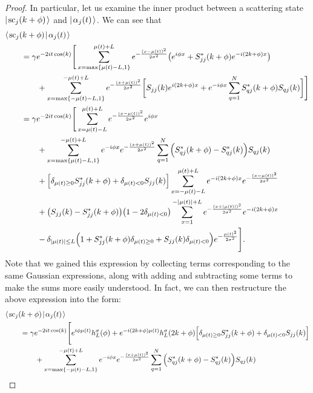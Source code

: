 \documentclass[../thesis-main/thesis-main]{subfiles}
\begin{document}
\begin{proof}
In particular, let us examine the inner product between a scattering state $|\mspace{2mu} \text{sc}_j(k+\phi) \mspace{2mu} \rangle$ and $|\mspace{2mu} \alpha_j(t) \mspace{2mu} \rangle$.  We can see that
\begin{align}
  &\langle\mspace{2mu} \text{sc}_j(k+\phi) \mspace{2mu} | \mspace{2mu} \alpha_j(t)\mspace{2mu} \rangle\nonumber\\
  &\qquad = \gamma e^{-2 i t \cos(k)}\Bigg[ \sum_{x = \max\{\mu(t) - L,1\}}^{\mu(t) + L}e^{-\frac{ (x - \mu(t))^2}{2\sigma^2}} \big( e^{ i \phi x} + S_{jj}^*(k+\phi) e^{-i (2k + \phi)x}\big)\nonumber\\
  &\qquad \qquad + \sum_{x = \max\{-\mu(t) - L,1\}}^{-\mu(t) + L} e^{-\frac{(x + \mu(t))^2}{2\sigma^2}} \bigg[S_{jj}(k) e^{ i(2k + \phi)x} + e^{-i \phi x}\sum_{q=1}^N S_{qj}^*(k+\phi) S_{qj}(k) \bigg]\Bigg]\\
  &\qquad = \gamma e^{-2it\cos(k)} \Bigg[ \sum_{x=\mu(t)-L}^{\mu(t)+L} e^{-\frac{(x-\mu(t))^2}{2\sigma^2}} e^{i \phi x}\nonumber\\
  &\qquad \qquad + \sum_{x=\max\{\mu(t) - L,1\}}^{-\mu(t)+L} e^{-i\phi x} e^{-\frac{(x+\mu(t))^2}{2\sigma^2}} \sum_{q=1}^N \Big(S_{qj}^*(k+\phi) -S_{qj}^*(k)  \Big)S_{qj}(k) \nonumber\\
  &\qquad\qquad + \Big[\delta_{\mu(t) \geq 0} S_{jj}^*(k+\phi) + \delta_{\mu(t) < 0} S_{jj}(k) \Big] \sum_{x=-\mu(t) - L}^{\mu(t) + L} e^{-i (2k + \phi) x}e^{-\frac{(x-\mu(t))^2}{2\sigma^2}} \nonumber\\
  &\qquad\qquad + \big(S_{jj}(k) - S_{jj}^*(k+\phi)\big)\big(1 - 2\delta_{\mu(t) < 0}\big)\sum_{x=1}^{-|\mu(t)| + L} e^{-\frac{(x+|\mu(t)|)^2}{2\sigma^2}}e^{-i(2k + \phi) x}\nonumber\\
  &\qquad\qquad  - \delta_{|\mu(t)| \leq L} \Big(1 + S_{jj}^*(k+\phi) \delta_{\mu(t)\geq 0} + S_{jj}(k) \delta_{\mu(t)< 0}\Big)e^{-\frac{\mu(t)^2}{2\sigma^2}}\Bigg].
\end{align}
Note that we gained this expression by collecting terms corresponding to the same Gaussian expressions, along with adding and subtracting some terms to make the sums more easily understood.  In fact, we can then restructure the above expression into the form:
\begin{align}
  &\braket{\scat_j(k+\phi)}{\alpha_j(t)}\nonumber\\
  &\qquad = \gamma e^{-2it\cos(k)} \Bigg[e^{ i \phi \mu(t)} h_L^\sigma(\phi) + e^{-i (2k+\phi) \mu(t)} h_L^\sigma(2k+\phi)\Big[\delta_{\mu(t) \geq 0} S_{jj}^*(k+\phi) + \delta_{\mu(t) < 0} S_{jj}(k) \Big]\nonumber\\
  &\qquad\qquad  + \sum_{x=\max\{-\mu(t) - L,1\}}^{-\mu(t)+L} e^{-i\phi x} e^{-\frac{(x+\mu(t))^2}{2\sigma^2}} \sum_{q=1}^N \Big(S_{qj}^*(k+\phi) -S_{qj}^*(k)  \Big)S_{qj}(k) \nonumber\\

\end{align}
\end{proof}
\end{document}
